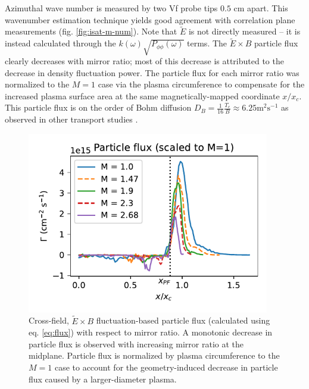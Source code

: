 Azimuthal wave number is measured by two Vf probe tips $0.5$ cm apart. This wavenumber estimation technique yields good agreement with correlation plane measurements (fig. \ref{fig:isat-m-num}). Note that $\tilde{E}$ is not directly measured -- it is instead calculated through the $k(\omega) \sqrt{P_{\phi \phi} (\omega)}$ terms.
The $\tilde{E} \times B$ particle flux clearly decreases with mirror ratio; most of this decrease is attributed to the decrease in density fluctuation power. The particle flux for each mirror ratio was normalized to the $M=1$ case via the plasma circumference to compensate for the increased plasma surface area at the same magnetically-mapped coordinate $x/x_c$. This particle flux is on the order of Bohm diffusion $D_B = \frac{1}{16} \frac{T_e}{B} \approx 6.25 \text{m}^{2} \text{s}^{-1}$ as observed in other transport studies \cite{Maggs-Carter_2008}.
\begin{figure}
    \centering
    \includegraphics[width=300pt]{figures/fig8.pdf}
    \caption{Cross-field, $\tilde{E} \times B$ fluctuation-based particle flux (calculated using eq. \ref{eq:flux}) with respect to mirror ratio. A monotonic decrease in particle flux is observed with increasing mirror ratio at the midplane. Particle flux is normalized by plasma circumference to the $M=1$ case to account for the geometry-induced decrease in particle flux caused by a larger-diameter plasma.}
    \label{fig:particle-flux}
\end{figure}


